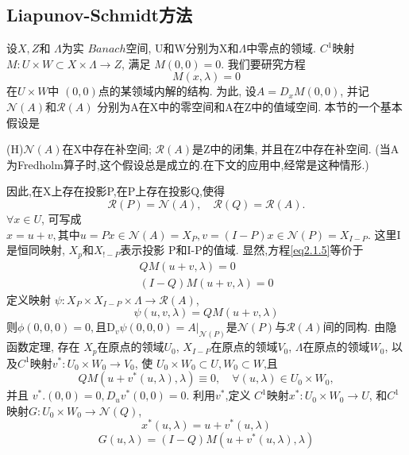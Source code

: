 \subsection{Liapunov-Schmidt方法}
设\(X,Z\)和 \(\Lambda\)为实 \(Banach\)空间,
U和W分别为X和\(\Lambda\)中零点的领域.
\(C^{1}\)映射
\(M : U \times W \subset X \times \Lambda \rightarrow Z\),
满足
\(M(0,0)=0\).
我们要研究方程
\begin{equation}
  \label{eq2.1.5}
  M(x ,\lambda)=0
\end{equation}
在\(U \times W\)中 \((0,0)\)点的某领域内解的结构.
为此,
设\( A=D_{x} M(0,0)\),
并记
\(\mathscr{N}(A) \text {和} \mathscr{R}(A)\)
分别为A在X中的零空间和A在Z中的值域空间.
本节的一个基本假设是
\par
(H)\(\mathscr{N}(A)\)在X中存在补空间;
\(\mathscr{R}(A)\)是Z中的闭集,
并且在Z中存在补空间.
(当A为Fredholm算子时,这个假设总是成立的.在下文的应用中,经常是这种情形.)
\par
因此,在X上存在投影P,在P上存在投影Q,使得
\begin{equation}
  \label{eq2.1.6}
  \mathscr{R}(P)=\mathscr{N}(A), \quad \mathscr{R}(Q)=\mathscr{R}(A).
\end{equation}
\(\forall x \in U\),
可写成
\(
x=u+v, \text{其中}  u=P x \in \mathscr{N}(A)=X_{P},
v=(I-P) x \in \mathscr{N}(P)=X_{I-P}.
\)
这里I是恒同映射,
\(X_{p}\)和\(X_{!-P}\)表示投影
P和I-P的值域.
显然,方程\eqref{eq2.1.5}等价于
\begin{align}
  \label{eq2.1.7}
  {Q M(u+v, \lambda)=0}  \\
  {(I-Q) M(u+v, \lambda)=0}
\end{align}
定义映射
\(\psi : X_{P} \times X_{I-P} \times \Lambda \rightarrow \mathscr{R}(A)\),
\begin{equation*}
\psi(u, v, \lambda)=Q M(u+v, \lambda)
\end{equation*}
则\(\phi(0,0,0)=0, \text{且} \mathrm{D}_{v} \psi(0,0,0)=\left.A\right|_{\mathcal{N}(P)}\)是\(\mathscr{N}(P)\)与\(\mathscr{R}(A)\)间的同构.
由隐函数定理,
存在
\(X_{p}\)在原点的领域\( U_{0}\),
\( X_{I-P}\)在原点的领域\(V_{0}\),
\(\Lambda\)在原点的领域\(W_{0}\),
以及\(C^{1}\)映射\(v^{*}: U_{0} \times W_{0} \rightarrow V_{0}\),
使
\(U_{0} \times W_{0} \subset U, W_{0} \subset W\),且
\begin{equation*}
Q M\left(u+v^{*}(u, \lambda), \lambda\right) \equiv 0, \quad \forall(u, \lambda) \in U_{0} \times W_{0},
\end{equation*}
并且
\(  v^{*} .(0,0)=0, D_{u} v^{*}(0,0)=0\).
利用\(v^{*}\),定义
\(C^{1}\)映射\(x^{*}:U_{0}\times W_{0}\rightarrow U\),
和\(C^{1}\)映射\(G : U_{0} \times W_{0} \rightarrow \mathscr{N}(Q)\),
\begin{equation}
x^{*}(u, \lambda)=u+v^{*}(u, \lambda)
\end{equation}
\begin{equation}
G(u, \lambda)=(I-Q) M\left(u+v^{*}(u, \lambda), \lambda\right)
\end{equation}

